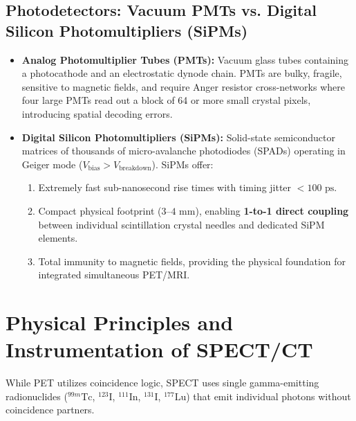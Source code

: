 \documentclass[11pt,a4paper]{article}
\begin{document}
\subsection{Photodetectors: Vacuum PMTs vs. Digital Silicon Photomultipliers (SiPMs)}
\begin{itemize}[leftmargin=2em]
    \item \textbf{Analog Photomultiplier Tubes (PMTs):} Vacuum glass tubes containing a photocathode and an electrostatic dynode chain. PMTs are bulky, fragile, sensitive to magnetic fields, and require Anger resistor cross-networks where four large PMTs read out a block of 64 or more small crystal pixels, introducing spatial decoding errors.
    \item \textbf{Digital Silicon Photomultipliers (SiPMs):} Solid-state semiconductor matrices of thousands of micro-avalanche photodiodes (SPADs) operating in Geiger mode ($V_{\text{bias}} > V_{\text{breakdown}}$). SiPMs offer:
    \begin{enumerate}
        \item Extremely fast sub-nanosecond rise times with timing jitter $< 100\text{ ps}$.
        \item Compact physical footprint ($3\text{--}4\text{ mm}$), enabling \textbf{1-to-1 direct coupling} between individual scintillation crystal needles and dedicated SiPM elements.
        \item Total immunity to magnetic fields, providing the physical foundation for integrated simultaneous PET/MRI.
    \end{enumerate}
\end{itemize}

\section{Physical Principles and Instrumentation of SPECT/CT}
While PET utilizes coincidence logic, SPECT uses single gamma-emitting radionuclides ($^{99m}\text{Tc}$, $^{123}\text{I}$, $^{111}\text{In}$, $^{131}\text{I}$, $^{177}\text{Lu}$) that emit individual photons without coincidence partners.
\end{document}
